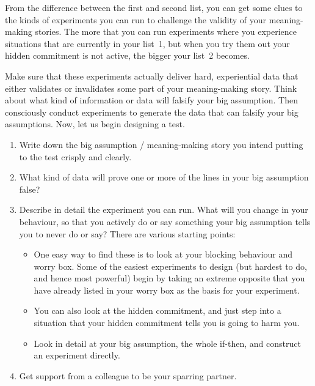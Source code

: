From the difference between the first and second list, you can get some clues to the kinds of experiments you can run to challenge the validity of your meaning-making stories. The more that you can run experiments where you experience situations that are currently in your list~1, but when you try them out your hidden commitment is not active, the bigger your list~2 becomes.


Make sure that these experiments actually deliver hard, experiential data that either validates or invalidates some part of your meaning-making story. Think about what kind of information or data will falsify your big assumption. Then consciously conduct experiments to generate the data that can falsify your big assumptions. Now, let us begin designing a test.




 \begin{enumerate}
\item Write down the big assumption / meaning-making story you intend putting to the test crisply and clearly.


\item What kind of data will prove one or more of the lines in your big assumption false?


\item Describe in detail the experiment you can run. What will you change in your behaviour, so that you actively do or say something your big assumption tells you to never do or say? There are various starting points: 


\begin{itemize}
\item One easy way to find these is to look at your blocking behaviour and worry box. Some of the easiest experiments to design (but hardest to do, and hence most powerful) begin by taking an extreme opposite that you have already listed in your worry box as the basis for your experiment.
\item You can also look at the hidden commitment, and just step into a situation that your hidden commitment tells you is going to harm you.
\item Look in detail at your big assumption, the whole if-then, and construct an experiment directly.
\end{itemize}


\item Get support from a colleague to be your sparring partner.
\end {enumerate}


